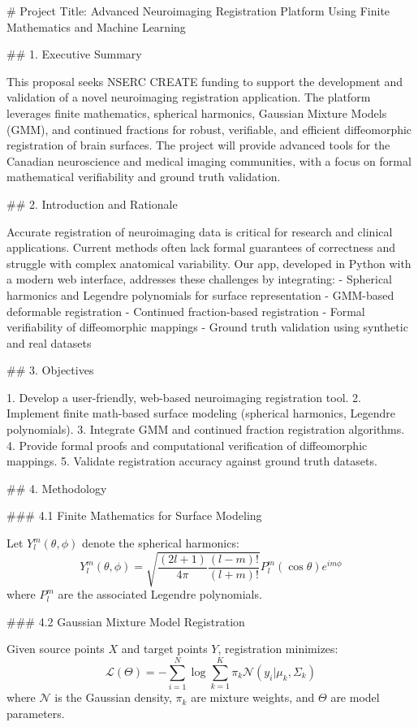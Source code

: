 
# Project Title: Advanced Neuroimaging Registration Platform Using Finite Mathematics and Machine Learning

## 1. Executive Summary

This proposal seeks NSERC CREATE funding to support the development and validation of a novel neuroimaging registration application. The platform leverages finite mathematics, spherical harmonics, Gaussian Mixture Models (GMM), and continued fractions for robust, verifiable, and efficient diffeomorphic registration of brain surfaces. The project will provide advanced tools for the Canadian neuroscience and medical imaging communities, with a focus on formal mathematical verifiability and ground truth validation.

## 2. Introduction and Rationale

Accurate registration of neuroimaging data is critical for research and clinical applications. Current methods often lack formal guarantees of correctness and struggle with complex anatomical variability. Our app, developed in Python with a modern web interface, addresses these challenges by integrating:
- Spherical harmonics and Legendre polynomials for surface representation
- GMM-based deformable registration
- Continued fraction-based registration
- Formal verifiability of diffeomorphic mappings
- Ground truth validation using synthetic and real datasets

## 3. Objectives

1. Develop a user-friendly, web-based neuroimaging registration tool.
2. Implement finite math-based surface modeling (spherical harmonics, Legendre polynomials).
3. Integrate GMM and continued fraction registration algorithms.
4. Provide formal proofs and computational verification of diffeomorphic mappings.
5. Validate registration accuracy against ground truth datasets.

## 4. Methodology

### 4.1 Finite Mathematics for Surface Modeling

Let $Y_l^m(\theta, \phi)$ denote the spherical harmonics:
$$
Y_l^m(\theta, \phi) = \sqrt{\frac{(2l+1)}{4\pi} \frac{(l-m)!}{(l+m)!}} P_l^m(\cos\theta) e^{im\phi}
$$
where $P_l^m$ are the associated Legendre polynomials.

### 4.2 Gaussian Mixture Model Registration

Given source points $X$ and target points $Y$, registration minimizes:
$$
\mathcal{L}(\Theta) = -\sum_{i=1}^N \log \sum_{k=1}^K \pi_k \mathcal{N}(y_i | \mu_k, \Sigma_k)
$$
where $\mathcal{N}$ is the Gaussian density, $\pi_k$ are mixture weights, and $\Theta$ are model parameters.

